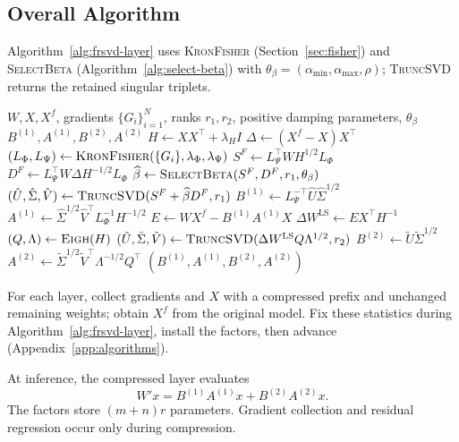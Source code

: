 \documentclass[11pt]{article}
\begin{document}
\subsection{Overall Algorithm}\label{sec:overall-algo}

Algorithm~\ref{alg:frsvd-layer} uses \textsc{KronFisher} (Section~\ref{sec:fisher}) and \textsc{SelectBeta} (Algorithm~\ref{alg:select-beta}) with $\theta_\beta=(\alpha_{\min},\alpha_{\max},\rho)$; \textsc{TruncSVD} returns the retained singular triplets.

\begin{algorithm}[t]
\caption{FR-SVD for one weight matrix}
\label{alg:frsvd-layer}
\small
\begin{algorithmic}[1]
\Require $W,X,X^f$, gradients $\{G_i\}_{i=1}^N$, ranks $r_1,r_2$, positive damping parameters, $\theta_\beta$
\Ensure $B^{(1)},A^{(1)},B^{(2)},A^{(2)}$
\State $H\gets XX^\top+\lambda_H I$
\State $\Delta\gets(X^f-X)X^\top$
\State $(L_\Phi,L_\Psi)\gets\Call{KronFisher}{\{G_i\},\lambda_\Phi,\lambda_\Psi}$
\State $S^F\gets L_\Psi^\top WH^{1/2}L_\Phi$
\State $D^F\gets L_\Psi^\top W\Delta H^{-1/2}L_\Phi$
\State $\widehat\beta\gets\Call{SelectBeta}{S^F,D^F,r_1,\theta_\beta}$
\State $(\hat U,\hat\Sigma,\hat V)\gets\Call{TruncSVD}{S^F+\widehat\beta D^F,r_1}$
\State $B^{(1)}\gets L_\Psi^{-\top}\hat U\hat\Sigma^{1/2}$
\State $A^{(1)}\gets\hat\Sigma^{1/2}\hat V^\top L_\Phi^{-1}H^{-1/2}$
\EndStage
{}
\State $E\gets WX^f-B^{(1)}A^{(1)}X$
\State $\Delta W^{\mathrm{LS}}\gets EX^\top H^{-1}$
\State $(Q,\Lambda)\gets\Call{Eigh}{H}$
\State $(\tilde U,\tilde\Sigma,\tilde V)\gets\Call{TruncSVD}{\Delta W^{\mathrm{LS}}Q\Lambda^{1/2},r_2}$
\State $B^{(2)}\gets\tilde U\tilde\Sigma^{1/2}$
\State $A^{(2)}\gets\tilde\Sigma^{1/2}\tilde V^\top\Lambda^{-1/2}Q^\top$
\EndStage
\State \Return $(B^{(1)},A^{(1)},B^{(2)},A^{(2)})$
\end{algorithmic}
\end{algorithm}

For each layer, collect gradients and $X$ with a compressed prefix and unchanged remaining weights; obtain $X^f$ from the original model. Fix these statistics during Algorithm~\ref{alg:frsvd-layer}, install the factors, then advance (Appendix~\ref{app:algorithms}).

At inference, the compressed layer evaluates
\begin{equation}
W'x=B^{(1)}A^{(1)}x+B^{(2)}A^{(2)}x.
\label{eq:deployment}
\end{equation}
The factors store $(m+n)r$ parameters. Gradient collection and residual regression occur only during compression.
\end{document}
